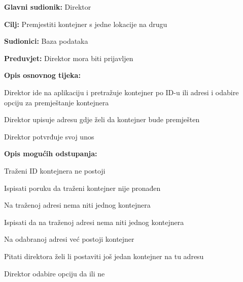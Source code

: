 			\noindent {}
			\begin{packed_item}
				
				\item \textbf{Glavni sudionik: } Direktor
				\item  \textbf{Cilj:} Premjestiti kontejner s jedne lokacije na drugu
				\item  \textbf{Sudionici:} Baza podataka
				\item  \textbf{Preduvjet:} Direktor mora biti prijavljen
				\item  \textbf{Opis osnovnog tijeka:}
				
				\item[] \begin{packed_enum}
					
					\item Direktor ide na aplikaciju i pretražuje kontejner po ID-u ili adresi i odabire opciju za premještanje kontejnera
					\item Direktor upisuje adresu gdje želi da kontejner bude premješten
					\item Direktor potvrđuje svoj unos
				\end{packed_enum}
				
				\item  \textbf{Opis mogućih odstupanja:}
				
				\item[] \begin{packed_item}
					
							\item[2.a] Traženi ID kontejnera ne postoji
					\item[] \begin{packed_enum}
						
						\item Ispisati poruku da traženi kontejner nije pronađen
						
					\end{packed_enum}
					\item[2.b] Na traženoj adresi nema niti jednog kontejnera
					\item[] \begin{packed_enum}
						
						\item Ispisati da na traženoj adresi nema niti jednog kontejnera
							\end{packed_enum}
					\item[2.c] Na odabranoj adresi već postoji kontejner
			
						\item[] \begin{packed_enum}
							
							\item Pitati direktora želi li postaviti još jedan kontejner na tu adresu
							\item Direktor odabire opciju da ili ne
							
						\end{packed_enum}
						
					
				\end{packed_item}
			\end{packed_item}
			
